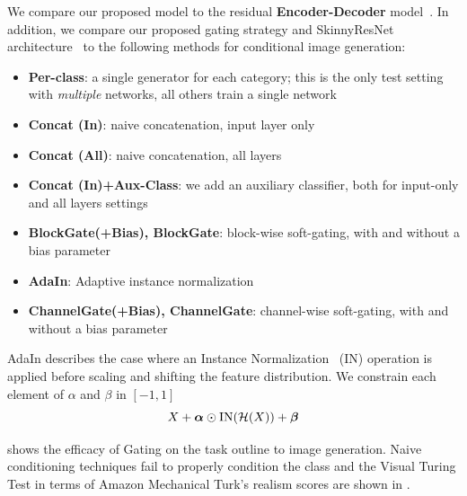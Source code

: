 We compare our proposed model to the residual \textbf{Encoder-Decoder} model~\cite{huang2018multimodal}.
In addition, we compare our proposed gating strategy and SkinnyResNet architecture~ to the following methods for  conditional image generation: \begin{itemize}[noitemsep]
\item{\bf Per-class}: a single generator for each category; this is the only test setting with \textit{multiple} networks, all others train a single network
\item{\bf Concat (In)}: naive concatenation, input layer only
\item{\bf Concat (All)}: naive concatenation, all layers
\item{\bf Concat (In)+Aux-Class}: we add an auxiliary classifier, both for input-only and all layers settings
\item{\bf BlockGate(+Bias), BlockGate}: block-wise soft-gating, with and without a bias parameter
\item{\bf AdaIn}: Adaptive instance normalization
\item{\bf ChannelGate(+Bias), ChannelGate}: channel-wise soft-gating, with and without a bias parameter
\end{itemize}
AdaIn describes the case where an Instance Normalization~\cite{ulyanovinstance} (IN) operation is applied before scaling and shifting the feature distribution.
We constrain each element of {\boldmath $\alpha$} and {\boldmath $\beta$} in $[-1, 1]$ %
\vspace{-2mm}
\begin{equation}
X + \mbox{\boldmath $\alpha$} \odot \text{IN} (\mathcal{H}(X)) + \mbox{\boldmath $\beta$}
\end{equation}

 shows the efficacy of Gating on the task outline to image generation. Naive conditioning techniques fail to properly condition the class and the Visual Turing Test in terms of Amazon Mechanical Turk's realism scores are shown in .

